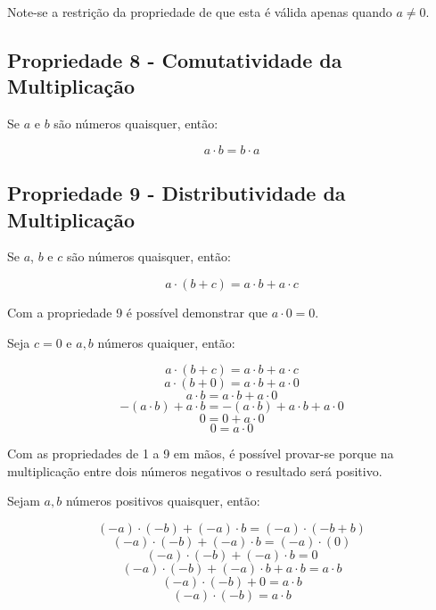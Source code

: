 \documentclass[
    12pt, %
    openright,
    twoside, %
    a4paper, %
    article,
    english,brazil %
]{abntex2}
\begin{document}
Note-se a restrição da propriedade de que esta é válida apenas quando $a \neq 0$.

\subsection{Propriedade 8 - Comutatividade da Multiplicação}
Se $a$ e $b$ são números quaisquer, então: 

$$a \cdot b=b \cdot a$$

\subsection{Propriedade 9 - Distributividade da Multiplicação}
Se $a$, $b$ e $c$ são números quaisquer, então: 

$$a \cdot (b+c)=a \cdot b+a \cdot c$$

Com a propriedade 9 é possível demonstrar que $a \cdot 0 = 0$. 

Seja $c = 0$ e $a, b$ números quaiquer, então: 

$$a \cdot (b+c)=a \cdot b+a \cdot c$$
$$a \cdot (b+0)=a \cdot b+a \cdot 0$$
$$a \cdot b=a \cdot b+a \cdot 0$$
$$-(a \cdot b)+a \cdot b=-(a \cdot b)+a \cdot b+a \cdot 0$$
$$0=0+a \cdot 0$$
$$0=a \cdot 0$$ 

Com as propriedades de 1 a 9 em mãos, é possível provar-se porque na multiplicação entre dois números negativos o resultado será positivo. 

Sejam $a,b$ números positivos quaisquer, então:

$$(-a) \cdot (-b)+(-a) \cdot b=(-a) \cdot (-b+b)$$
$$(-a) \cdot (-b)+(-a) \cdot b=(-a) \cdot (0)$$
$$(-a) \cdot (-b)+(-a) \cdot b=0$$
$$(-a) \cdot (-b)+(-a) \cdot b+a \cdot b=a \cdot b$$
$$(-a) \cdot (-b)+0=a \cdot b$$
$$(-a) \cdot (-b)=a \cdot b$$
\end{document}
